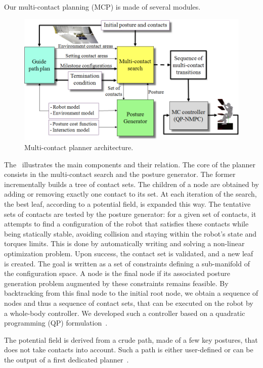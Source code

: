 Our multi-contact planning (MCP) is made of several modules. 
\begin{figure}[!htb]
 \centering
 \includegraphics[width=\columnwidth]{papers/RAM2013/pictures/mcp.png}
 \caption{Multi-contact planner architecture.}
 \label{fig:mcp}
\end{figure}
The~ illustrates the main components and their relation. The core of the planner consists in the multi-contact search and the posture generator. The former incrementally builds a tree of contact sets. The children of a node are obtained by adding or removing exactly one contact to its set. At each iteration of the search, the best leaf, according to a potential field, is expanded this way. The tentative sets of contacts are tested by the posture generator: for a given set of contacts, it attempts to find a configuration of the robot that satisfies these contacts while being statically stable, avoiding collision and staying within the robot's state and torques limits. This is done by automatically writing and solving a non-linear optimization problem. Upon success, the contact set is validated, and a new leaf is created. The goal is written as a set of constraints defining a sub-manifold of the configuration space. A node is the final node if its associated posture generation problem augmented by these constraints remains feasible. By backtracking from this final node to the initial root node, we obtain a sequence of nodes and thus a sequence of contact sets, that can be executed on the robot by a whole-body controller. We developed such a controller based on a quadratic programming (QP) formulation~\cite{bouyarmane:iros:2011}.

The potential field is derived from a crude path, made of a few key postures, that does not take contacts into account. Such a path is either user-defined or can be the output of a first dedicated planner~\cite{bouyarmane:icra:2009}.

